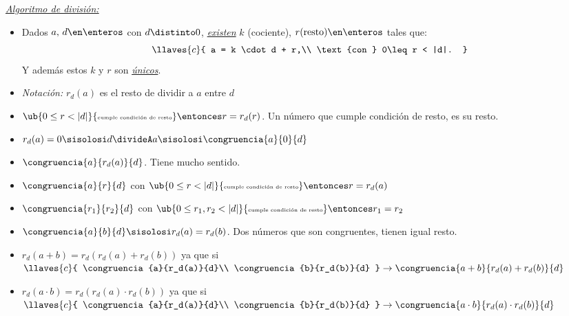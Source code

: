 \textit{\underline{Algoritmo de división:}}\\
\newcommand{\condicionResto}[1]{\ub{0 \leq #1 < |d|}{\text{\tiny cumple condición de resto}}}
\begin{itemize}
  \item
        Dados $a, \, d \en \enteros$ con $d \distinto 0$,
        \textit{\underline{existen}} $k$ (cociente),
        $r \text{(resto)} \en \enteros$ tales que:\\
        \[
          \llaves{c}{
            a =  k \cdot d + r,\\
            \text{con } 0\leq r < |d|.
          }
        \]
        Y además estos $k$ y $r$ son \textit{\underline{únicos}}.\\

  \item \textit{Notación: } $r_d(a)$ es el resto de dividir a $a$ entre $d$

  \item $\condicionResto{r} \entonces r = r_d(r)$. Un número que cumple condición de resto, es su resto.

  \item $r_d(a) = 0 \sisolosi d \divideA a \sisolosi \congruencia{a}{0}{d}$

  \item $\congruencia{a}{r_d(a)}{d}$. Tiene mucho sentido.

  \item $\congruencia{a}{r}{d}$ con $\condicionResto{r} \entonces r = r_d(a)$

  \item $\congruencia{r_1}{r_2}{d}$ con $\condicionResto{r_1,r_2} \entonces r_1 = r_2$

  \item $\congruencia{a}{b}{d} \sisolosi r_d(a) = r_d(b)$. Dos números que son congruentes, tienen igual resto.

  \item $r_d(a+b) = r_d(r_d(a) + r_d(b))$ ya que si
        $ \llaves{c}{
            \congruencia{a}{r_d(a)}{d}\\
            \congruencia{b}{r_d(b)}{d}
          } \to \congruencia{a + b}{r_d(a) + r_d(b)}{d}
        $

  \item $r_d(a \cdot b) = r_d(r_d(a) \cdot r_d(b))$ ya que si
        $ \llaves{c}{
            \congruencia{a}{r_d(a)}{d}\\
            \congruencia{b}{r_d(b)}{d}
          } \to \congruencia{a \cdot b}{r_d(a) \cdot r_d(b)}{d}$
\end{itemize}

